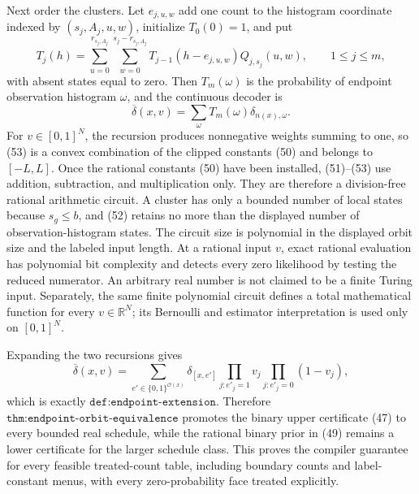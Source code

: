 Next order the clusters.  Let \(e_{j,u,w}\) add one count to the histogram coordinate indexed by \((s_j,A_j,u,w)\), initialize \(T_0(0)=1\), and put
\[
 T_j(h)=
 \sum_{u=0}^{r_{s_j,A_j}}
 \sum_{w=0}^{s_j-r_{s_j,A_j}}
 T_{j-1}(h-e_{j,u,w})Q_{j,s_j}(u,w),
 \qquad 1\le j\le m,
\tag{52}
\]
with absent states equal to zero.  Then \(T_m(\omega)\) is the probability of endpoint observation histogram \(\omega\), and the continuous decoder is
\[
 \overline\delta(x,v)=
 \sum_\omega T_m(\omega)\delta_{n(x),\omega}.
\tag{53}
\]
For \(v\in[0,1]^N\), the recursion produces nonnegative weights summing to one, so (53) is a convex combination of the clipped constants (50) and belongs to \([-L,L]\).  Once the rational constants (50) have been installed, (51)--(53) use addition, subtraction, and multiplication only.  They are therefore a division-free rational arithmetic circuit.  A cluster has only a bounded number of local states because \(s_g\le b\), and (52) retains no more than the displayed number of observation-histogram states.  The circuit size is polynomial in the displayed orbit size and the labeled input length.  At a rational input \(v\), exact rational evaluation has polynomial bit complexity and detects every zero likelihood by testing the reduced numerator.  An arbitrary real number is not claimed to be a finite Turing input.  Separately, the same finite polynomial circuit defines a total mathematical function for every \(v\in\mathbb R^N\); its Bernoulli and estimator interpretation is used only on \([0,1]^N\).

Expanding the two recursions gives
\[
 \overline\delta(x,v)=
 \sum_{e'\in\{0,1\}^{\mathcal O(x)}}
 \delta_{[x,e']}
 \prod_{j:e'_j=1}v_j
 \prod_{j:e'_j=0}(1-v_j),
\tag{54}
\]
which is exactly \(\texttt{def:endpoint-extension}\).  Therefore \(\texttt{thm:endpoint-orbit-equivalence}\) promotes the binary upper certificate (47) to every bounded real schedule, while the rational binary prior in (49) remains a lower certificate for the larger schedule class.  This proves the compiler guarantee for every feasible treated-count table, including boundary counts and label-constant menus, with every zero-probability face treated explicitly.
